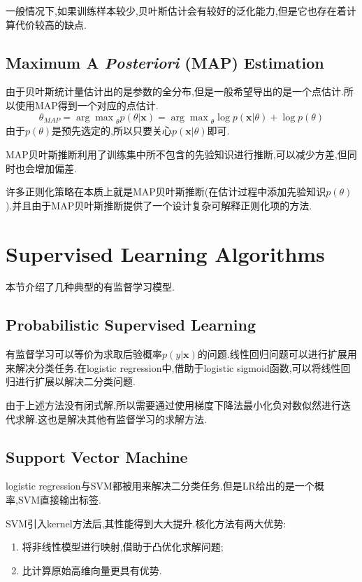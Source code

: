 一般情况下,如果训练样本较少,贝叶斯估计会有较好的泛化能力,但是它也存在着计算代价较高的缺点.

\subsection{Maximum A \textit{Posteriori} (MAP) Estimation}

由于贝叶斯统计量估计出的是参数的全分布,但是一般希望导出的是一个点估计.所以使用MAP得到一个对应的点估计.
\begin{equation}\label{eq:map_estimation}
\theta_{MAP}={\arg\max}_\theta p(\theta|\mathbf x)={\arg\max}_\theta\log p(\mathbf x|\theta)+\log p(\theta)
\end{equation}
由于$p(\theta)$是预先选定的,所以只要关心$p(\mathbf x|\theta)$即可.

MAP贝叶斯推断利用了训练集中所不包含的先验知识进行推断,可以减少方差,但同时也会增加偏差.

许多正则化策略在本质上就是MAP贝叶斯推断(在估计过程中添加先验知识$p(\theta)$).并且由于MAP贝叶斯推断提供了一个设计复杂可解释正则化项的方法.

\section{Supervised Learning Algorithms}

本节介绍了几种典型的有监督学习模型.

\subsection{Probabilistic Supervised Learning}

有监督学习可以等价为求取后验概率$p(y|\mathbf x)$的问题.线性回归问题可以进行扩展用来解决分类任务.在logistic regression中,借助于logistic sigmoid函数,可以将线性回归进行扩展以解决二分类问题.

由于上述方法没有闭式解,所以需要通过使用梯度下降法最小化负对数似然进行迭代求解.这也是解决其他有监督学习的求解方法.

\subsection{Support Vector Machine}

logistic regression与SVM都被用来解决二分类任务.但是LR给出的是一个概率,SVM直接输出标签.

SVM引入kernel方法后,其性能得到大大提升.核化方法有两大优势:
\begin{enumerate}
\item 将非线性模型进行映射,借助于凸优化求解问题;
\item 比计算原始高维向量更具有优势.
\end{enumerate}

